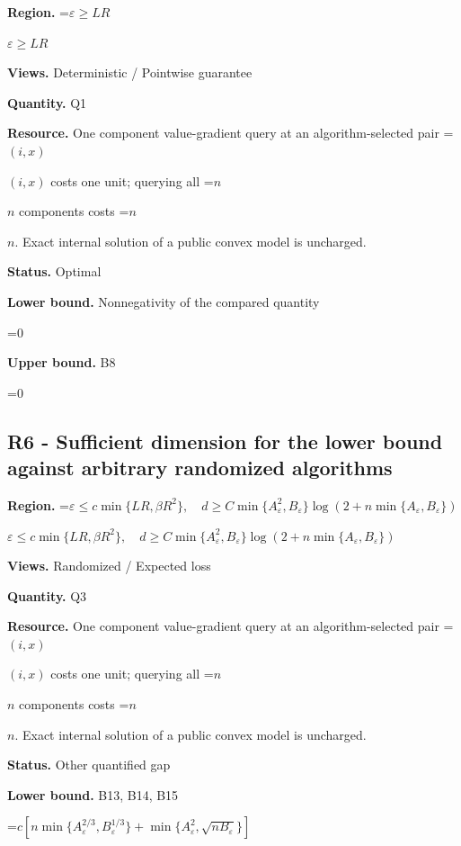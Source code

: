 \documentclass[10pt,a4paper]{article}
\newcommand{\AtlasMath}[1]{\par\begingroup\centering\setbox0=\hbox{$\displaystyle #1$}\ifdim\wd0>1.4\linewidth\typeout{ATLAS WIDE FORMULA: \the\wd0}\fi\ifdim\wd0>\linewidth\resizebox{\linewidth}{!}{\box0}\else\box0\fi\par\endgroup}
\newcommand{\AtlasInlineMath}[1]{\begingroup\setbox0=\hbox{$#1$}\ifdim\wd0>.4\linewidth\endgroup\AtlasMath{#1}\else\endgroup$#1$\fi}
\begin{document}
\textbf{Region.} \AtlasInlineMath{\varepsilon\ge LR}



\textbf{Views.} Deterministic / Pointwise guarantee



\textbf{Quantity.} Q1



\textbf{Resource.} One component value-gradient query at an algorithm-selected pair \AtlasInlineMath{(i,x)} costs one unit; querying all \AtlasInlineMath{n} components costs \AtlasInlineMath{n}. Exact internal solution of a public convex model is uncharged.



\textbf{Status.} Optimal



\textbf{Lower bound.} Nonnegativity of the compared quantity



\AtlasMath{0}


\textbf{Upper bound.} B8



\AtlasMath{0}


\subsection{R6 - Sufficient dimension for the lower bound against arbitrary randomized algorithms}


\textbf{Region.} \AtlasInlineMath{\varepsilon\le c\min\{LR,\beta R^2\},\quad d\ge C\min\{A_\varepsilon^2,B_\varepsilon\}\log(2+n\min\{A_\varepsilon,B_\varepsilon\})}



\textbf{Views.} Randomized / Expected loss



\textbf{Quantity.} Q3



\textbf{Resource.} One component value-gradient query at an algorithm-selected pair \AtlasInlineMath{(i,x)} costs one unit; querying all \AtlasInlineMath{n} components costs \AtlasInlineMath{n}. Exact internal solution of a public convex model is uncharged.



\textbf{Status.} Other quantified gap



\textbf{Lower bound.} B13, B14, B15



\AtlasMath{c[n\min\{A_\varepsilon^{2/3},B_\varepsilon^{1/3}\}+\min\{A_\varepsilon^2,\sqrt{nB_\varepsilon}\}]}
\end{document}
